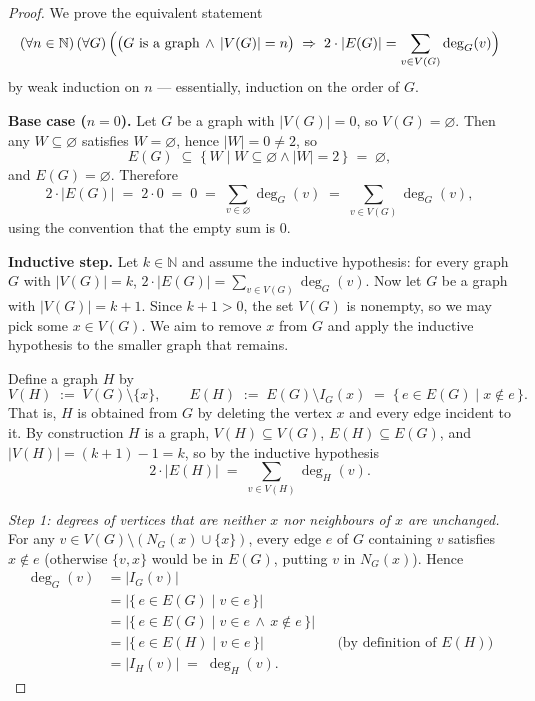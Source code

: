 \documentclass[11pt]{article}
\theoremstyle{defstyle}
\theoremstyle{thmstyle}
\theoremstyle{notstyle}
\theoremstyle{cautionstyle}
\newcommand{\N}{\mathbb{N}}
\begin{document}
\begin{proof}
We prove the equivalent statement
\[
  (\forall n \in \N)\,(\forall G)\,\Bigl(\bigl(G \text{ is a graph} \,\wedge\, |V(G)| = n\bigr)
  \;\Rightarrow\; 2 \cdot |E(G)| = \sum_{v \in V(G)} \deg_G(v)\Bigr)
\]
by weak induction on $n$ --- essentially, induction on the order of $G$.

\smallskip
\noindent\textbf{Base case ($n = 0$).}
Let $G$ be a graph with $|V(G)| = 0$, so $V(G) = \varnothing$. Then any
$W \subseteq \varnothing$ satisfies $W = \varnothing$, hence $|W| = 0 \neq 2$,
so
\[
  E(G) \;\subseteq\; \bigl\{\, W \mid W \subseteq \varnothing \wedge |W| = 2 \,\bigr\} \;=\; \varnothing,
\]
and $E(G) = \varnothing$. Therefore
\[
  2 \cdot |E(G)| \;=\; 2 \cdot 0 \;=\; 0
  \;=\; \sum_{v \in \varnothing} \deg_G(v)
  \;=\; \sum_{v \in V(G)} \deg_G(v),
\]
using the convention that the empty sum is $0$.

\smallskip
\noindent\textbf{Inductive step.}
Let $k \in \N$ and assume the inductive hypothesis: for every graph $G$
with $|V(G)| = k$, $2 \cdot |E(G)| = \sum_{v \in V(G)} \deg_G(v)$. Now let
$G$ be a graph with $|V(G)| = k+1$. Since $k+1 > 0$, the set $V(G)$ is
nonempty, so we may pick some $x \in V(G)$. We aim to remove $x$ from $G$
and apply the inductive hypothesis to the smaller graph that remains.

Define a graph $H$ by
\[
  V(H) \;:=\; V(G) \setminus \{x\},
  \qquad
  E(H) \;:=\; E(G) \setminus I_G(x) \;=\; \bigl\{\, e \in E(G) \mid x \notin e \,\bigr\}.
\]
That is, $H$ is obtained from $G$ by deleting the vertex $x$ and every
edge incident to it. By construction $H$ is a graph, $V(H) \subseteq V(G)$,
$E(H) \subseteq E(G)$, and $|V(H)| = (k+1) - 1 = k$, so by the inductive
hypothesis
\[
  2 \cdot |E(H)| \;=\; \sum_{v \in V(H)} \deg_H(v). \tag{$\star$}
\]

\smallskip
\noindent\textit{Step 1: degrees of vertices that are neither $x$ nor
neighbours of $x$ are unchanged.}
For any $v \in V(G) \setminus (N_G(x) \cup \{x\})$, every edge $e$ of $G$
containing $v$ satisfies $x \notin e$ (otherwise $\{v,x\}$ would be in
$E(G)$, putting $v$ in $N_G(x)$). Hence
\begin{align*}
  \deg_G(v)
  &= |I_G(v)| \\
  &= |\{\, e \in E(G) \mid v \in e \,\}| \\
  &= |\{\, e \in E(G) \mid v \in e \,\wedge\, x \notin e \,\}| \\
  &= |\{\, e \in E(H) \mid v \in e \,\}|
       && \text{(by definition of $E(H)$)}\\
  &= |I_H(v)| \;=\; \deg_H(v).
\end{align*}


\end{proof}
\end{document}
